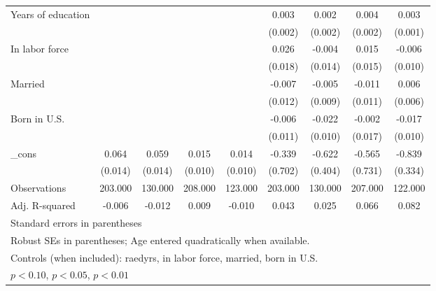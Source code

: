 \begin{table}[htbp]
\begin{tabular}{l*{8}{c}}
Years of education&                  &                  &                  &                  &    0.003         &    0.002         &    0.004\sym{*}  &    0.003\sym{**} \\
          &                  &                  &                  &                  &  (0.002)         &  (0.002)         &  (0.002)         &  (0.001)         \\
In labor force&                  &                  &                  &                  &    0.026         &   -0.004         &    0.015         &   -0.006         \\
          &                  &                  &                  &                  &  (0.018)         &  (0.014)         &  (0.015)         &  (0.010)         \\
Married   &                  &                  &                  &                  &   -0.007         &   -0.005         &   -0.011         &    0.006         \\
          &                  &                  &                  &                  &  (0.012)         &  (0.009)         &  (0.011)         &  (0.006)         \\
Born in U.S.&                  &                  &                  &                  &   -0.006         &   -0.022\sym{**} &   -0.002         &   -0.017\sym{*}  \\
          &                  &                  &                  &                  &  (0.011)         &  (0.010)         &  (0.017)         &  (0.010)         \\
\_cons    &    0.064\sym{***}&    0.059\sym{***}&    0.015         &    0.014         &   -0.339         &   -0.622         &   -0.565         &   -0.839\sym{**} \\
          &  (0.014)         &  (0.014)         &  (0.010)         &  (0.010)         &  (0.702)         &  (0.404)         &  (0.731)         &  (0.334)         \\
\midrule
Observations&  203.000         &  130.000         &  208.000         &  123.000         &  203.000         &  130.000         &  207.000         &  122.000         \\
Adj. R-squared&   -0.006         &   -0.012         &    0.009         &   -0.010         &    0.043         &    0.025         &    0.066         &    0.082         \\
\bottomrule
\multicolumn{9}{l}{\footnotesize Standard errors in parentheses}\\
\multicolumn{9}{l}{\footnotesize Robust SEs in parentheses; Age entered quadratically when available.}\\
\multicolumn{9}{l}{\footnotesize Controls (when included): raedyrs, in labor force, married, born in U.S.}\\
\multicolumn{9}{l}{\footnotesize \sym{*} \(p<0.10\), \sym{**} \(p<0.05\), \sym{***} \(p<0.01\)}\\
\end{tabular}
\end{table}
